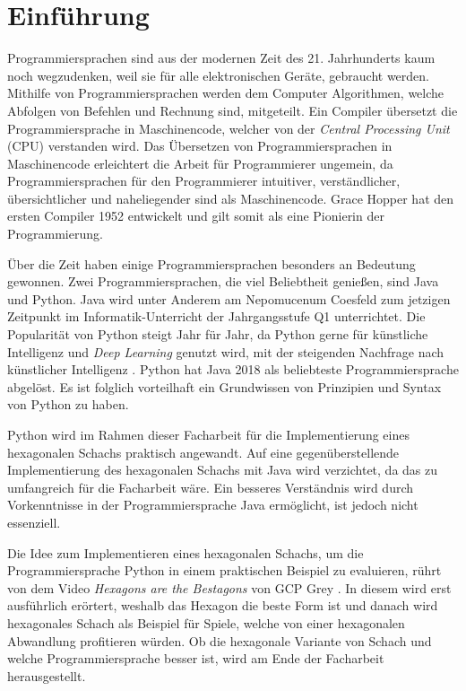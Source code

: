 \setcounter{page}{3}
\chapter{Einführung} %
Programmiersprachen sind aus der modernen Zeit des 21. Jahrhunderts kaum noch wegzudenken, weil sie für alle elektronischen Geräte, gebraucht werden. Mithilfe von Programmiersprachen werden dem Computer Algorithmen, welche Abfolgen von Befehlen und Rechnung sind, mitgeteilt. Ein Compiler übersetzt die Programmiersprache in Maschinencode, welcher von der \textit{Central Processing Unit} (CPU) verstanden wird. Das Übersetzen von Programmiersprachen in Maschinencode erleichtert die Arbeit für Programmierer ungemein, da Programmiersprachen für den Programmierer intuitiver, verständlicher, übersichtlicher und naheliegender sind als Maschinencode. Grace Hopper hat den ersten Compiler 1952 entwickelt und gilt somit als eine Pionierin der Programmierung.
\cite{Louis:2010}

\par %
Über die Zeit haben einige Programmiersprachen besonders an Bedeutung gewonnen. 
Zwei Programmiersprachen, die viel Beliebtheit genießen, sind Java und Python. 
Java wird unter Anderem am Nepomucenum Coesfeld zum jetzigen Zeitpunkt im Informatik-Unterricht der Jahrgangsstufe Q1 unterrichtet. 
Die Popularität von Python steigt Jahr für Jahr, da Python gerne für künstliche Intelligenz und \textit{Deep Learning} genutzt wird, mit der steigenden Nachfrage nach künstlicher Intelligenz \cite{Github:PYPL}\cite{Gray:2017}. 
Python hat Java 2018 als beliebteste Programmiersprache abgelöst. 
Es ist folglich vorteilhaft ein Grundwissen von Prinzipien und Syntax von Python zu haben. 

\par %
Python wird im Rahmen dieser Facharbeit für die Implementierung eines hexagonalen Schachs praktisch angewandt. 
Auf eine gegenüberstellende Implementierung des hexagonalen Schachs mit Java wird verzichtet, da das zu umfangreich für die Facharbeit wäre. 
Ein besseres Verständnis wird durch Vorkenntnisse in der Programmiersprache Java ermöglicht, ist jedoch nicht essenziell. 

\par %
Die Idee zum Implementieren eines hexagonalen Schachs, um die Programmiersprache Python in einem praktischen Beispiel zu evaluieren, rührt von dem Video \textit{Hexagons are the Bestagons} von GCP Grey \cite{Grey:Bestagons}. 
In diesem wird erst ausführlich erörtert, weshalb das Hexagon die beste Form ist und danach wird hexagonales Schach als Beispiel für Spiele, welche von einer hexagonalen Abwandlung profitieren würden. 
Ob die hexagonale Variante von Schach und welche Programmiersprache besser ist, wird am Ende der Facharbeit herausgestellt.

